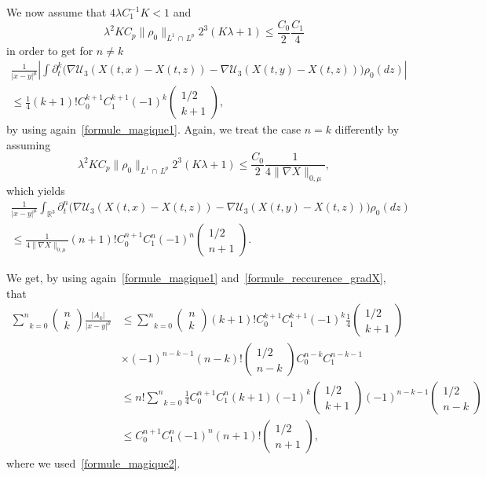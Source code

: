 \documentclass[AHL,Unicode,longabstracts,published]{cedram}
\newcommand{\R}{\mathbb{R}}
\newcommand{\clU}{\mathcal{U}}
\renewcommand{\leq}{\leqslant}
\begin{document}
We now assume that $4\lambda C_1^{-1}K<1$ and
\[
\lambda^2 K C_p \|\rho_0\|_{L^1\,\cap\,L^p}2^3(K\lambda+1)\leq \frac{C_0}{2} \frac{C_1}{4}
\]
in order to get for $n\neq k$
\begin{multline*}
\frac{1}{|x-y|^\mu}
\left| \int \partial_t^k \big(\nabla \clU_3(X(t,x)-X(t,z))-\nabla \clU_3(X(t,y)-X(t,z)) \big)\rho_0(dz) \right| \\
\leq \frac{1}{4}(k+1)!C_0^{k+1} C_1^{k+1} (-1)^k
\begin{pmatrix}
1/2\\ k+1
\end{pmatrix},
\end{multline*}
by using again~\eqref{formule_magique1}.
Again, we treat the case $n=k$ differently by assuming
\[
\lambda^2 K C_p \|\rho_0\|_{L^1\,\cap\,L^p}2^3(K\lambda+1)\leq \frac{C_0}{2} \frac{1}{4\|\nabla X\|_{0,\mu}},
\]
which yields
\begin{multline*}
\frac{1}{|x-y|^\mu}\int_{\R^3} \partial_t^n \big(\nabla \clU_3(X(t,x)-X(t,z))-\nabla \clU_3(X(t,y)-X(t,z)) \big)\rho_0(dz)\\
\leq \frac{1}{4 \|\nabla X\|_{0,\mu}}(n+1)!C_0^{n+1} C_1^{n} (-1)^n
\begin{pmatrix}
1/2\\ n+1
\end{pmatrix}.
\end{multline*}


We get, by using again~\eqref{formule_magique1} and~\eqref{formule_reccurence_gradX}, that
\begin{align*}
\underset{k=0}{\overset{n}{\sum}}
\begin{pmatrix}
n \\k
\end{pmatrix}\frac{|A_k|}{|x-y|^\mu}&\leq
\underset{k=0}{\overset{n}{\sum}}
\begin{pmatrix}
n \\k
\end{pmatrix}
(k+1)!C_0^{k+1} C_1^{k+1} (-1)^k \frac{1}{4}
\begin{pmatrix}
1/2\\ k+1
\end{pmatrix}\\
&\times (-1)^{n-k-1}(n-k)!
\begin{pmatrix}
1/2 \\ n-k
\end{pmatrix}
C_0^{n-k} C_1^{n-k-1}\\
&\leq n! \underset{k=0}{\overset{n}{\sum}}\frac{1}{4} C_0^{n+1} C_1^{n} (k+1)(-1)^k
\begin{pmatrix}
1/2\\ k+1
\end{pmatrix} (-1)^{n-k-1}
\begin{pmatrix}
1/2 \\ n-k
\end{pmatrix}
\\
&\leq C_0^{n+1} C_1^{n} (-1)^n (n+1)!
\begin{pmatrix}
1/2 \\ n+1
\end{pmatrix},
\end{align*}
where we used~\eqref{formule_magique2}.
\end{document}
